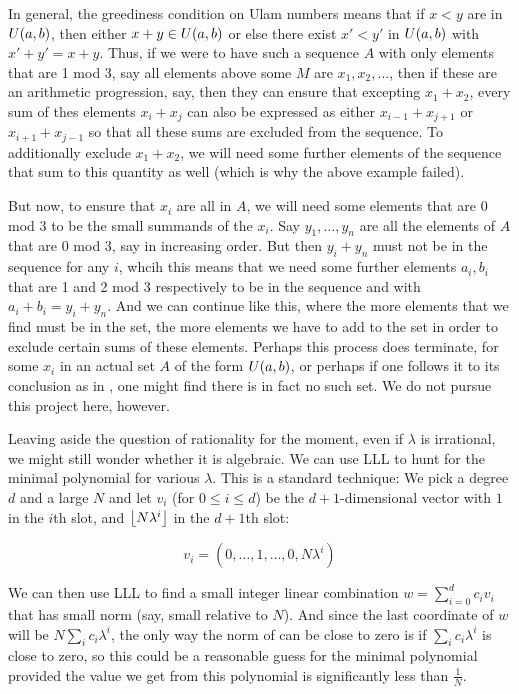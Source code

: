 \documentclass{article}
\theoremstyle{definition}
\theoremstyle{remark}
\numberwithin{equation}{section}
\begin{document}
In general, the greediness condition on Ulam numbers means that if
$x < y$ are in $U(a,b)$, then either $x+y \in U(a,b)$ or
else there exist $x' < y'$ in $U(a,b)$ with $x'+y' = x+y$.  Thus,
if we were to have such a sequence $A$ with only elements that are 1
mod 3, say all elements above some $M$ are $x_1, x_2, \ldots$, then if
these are an arithmetic progression, say, then they can ensure that
excepting $x_1 + x_2$, every sum of thes elements $x_i + x_j$ can also
be expressed as either $x_{i-1} + x_{j+1}$ or $x_{i+1}+x_{j-1}$ so
that all these sums are excluded from the sequence.  To additionally
exclude $x_1 + x_2$, we will need some further elements of the
sequence that sum to this quantity as well (which is why the above
example failed).

But now, to ensure that $x_i$ are all in $A$, we will need some
elements that are 0 mod 3 to be the small summands of the $x_i$.  Say
$y_1, \ldots, y_n$ are all the elements of $A$ that are 0 mod 3, say
in increasing order.  But then $y_i + y_n$ must not be in the sequence
for any $i$, whcih this means that we need some further elements
$a_i, b_i$ that are 1 and 2 mod 3 respectively to be in the sequence
and with $a_i+b_i = y_i + y_n$.  And we can continue like this, where
the more elements that we find must be in the set, the more elements
we have to add to the set in order to exclude certain sums of these
elements.  Perhaps this process does terminate, for some $x_i$ in an
actual set $A$ of the form $U(a,b)$, or perhaps if one follows it
to its conclusion as in \cite{schmerl:jct1994}, one might find
there is in fact no such set.  We do not pursue this project here,
however.  

Leaving aside the question of rationality for the moment, even if
$\lambda$ is irrational, we might still wonder whether it is
algebraic.  We can use LLL to hunt for the minimal polynomial for
various $\lambda$.  This is a standard technique: We pick a degree $d$
and a large $N$ and let $v_i$ (for $0 \leq i \leq d$) be the
$d+1$-dimensional vector with $1$ in the $i$th slot, and
$\left\lfloor N\lambda^i \right\rfloor$ in the $d+1$th slot:

\[v_i = \left(0, \ldots, 1, \ldots, 0, N\lambda^i\right)\]

We can then use LLL to find a small integer linear combination
$w = \sum_{i=0}^d c_i v_i$ that has small norm (say, small relative to
$N$).  And since the last coordinate of $w$ will be
$N \sum_i c_i \lambda^i$, the only way the norm of can be close to
zero is if $\sum_i c_i \lambda^i$ is close to zero, so this could be a
reasonable guess for the minimal polynomial provided the value we get
from this polynomial is significantly less than $\frac{1}{N}$.  
\end{document}
